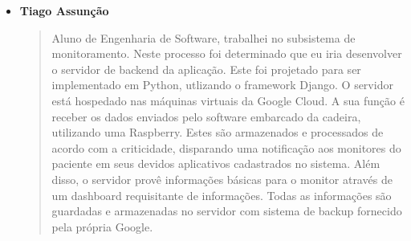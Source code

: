 \begin{itemize}
    \item \textbf{Tiago Assunção}
    \begin{quote}
      Aluno de Engenharia de Software, trabalhei no subsistema de 
      monitoramento. Neste processo foi determinado que eu iria desenvolver
        o servidor de backend da aplicação. Este foi projetado para ser implementado
        em Python, utlizando o framework Django. O servidor está hospedado nas máquinas virtuais
        da Google Cloud. A sua função é receber os dados enviados pelo software embarcado
        da cadeira, utilizando uma Raspberry. Estes são armazenados e processados de
        acordo com a criticidade, disparando uma notificação aos monitores do paciente
        em seus devidos aplicativos cadastrados no sistema. Além disso, o servidor provê
        informações básicas para o monitor através de um dashboard requisitante de informações.
        Todas as informações são guardadas e armazenadas no servidor com sistema de backup
        fornecido pela própria Google.
    \end{quote}
\end{itemize}
